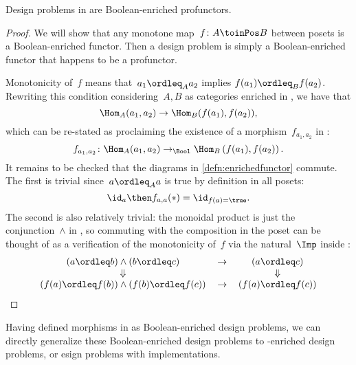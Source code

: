 \begin{proposition}
  Design problems in \DP are Boolean-enriched profunctors.
\end{proposition}
\begin{proof}
  We will show that any monotone map~$f\colon A \toinPos B$ between posets is a Boolean-enriched functor. Then a design problem is simply a Boolean-enriched functor that happens to be a profunctor.

  Monotonicity of~$f$ means that~$a_1 \ordleq_A a_2$ implies $f(a_1) \ordleq_B f(a_2)$. Rewriting this condition considering~$A, B$ as categories enriched in \Bool, we have that
  \begin{equation*}
    \Hom_A(a_1, a_2) \to \Hom_B(f(a_1), f(a_2)),
  \end{equation*}
  which can be re-stated as proclaiming the existence of a morphism~$f_{a_1, a_2}$ in \Bool:
  \begin{equation*}
    f_{a_1, a_2} \colon \Hom_A(a_1, a_2) \to_{\Bool} \Hom_B\left(f(a_1), f(a_2)\right).
  \end{equation*}
  It remains to be checked that the diagrams in \cref{defn:enrichedfunctor} commute. The first is trivial since~$a \ordleq_A a$ is true by definition in all posets:
  \begin{equation*}
    \id_{a} \then f_{a,a} (\ast) = \id_{f(a) = \true}.
  \end{equation*}
  The second is also relatively trivial: the monoidal product is just the conjunction~$\wedge$ in \Bool, so commuting with the composition in the poset can be thought of as a verification of the monotonicity of~$f$ via the natural~$\Imp$ inside \Bool:
  \begin{equation*}
    \begin{tabular}{ccc}
      $(a \ordleq b) \wedge (b \ordleq c)$             & $\to$ & $(a \ordleq c)$       \\
      $\Downarrow$                                     &       & $\Downarrow$          \\
      $(f(a) \ordleq f(b)) \wedge (f(b) \ordleq f(c))$ & $\to$ & $(f(a) \ordleq f(c))$
    \end{tabular}
  \end{equation*}
\end{proof}

Having defined morphisms in \DP as Boolean-enriched design problems, we can directly generalize these Boolean-enriched design problems to \Set-enriched design problems, or esign problems with implementations.

